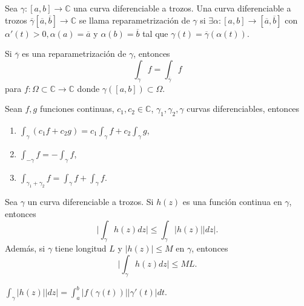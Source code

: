 \begin{defn}[Reparametrización]
  Sea $\gamma: [a, b] \to \mathbb{C}$ una curva diferenciable a trozos. Una curva diferenciable a trozos $\overline{\gamma} [\overline{a}, \overline{b}] \to \mathbb{C}$ se llama reparametrización de $\gamma$ si $\exists \alpha: [a, b] \to [\overline{a}, \overline{b}]$ con $\alpha'(t) > 0, \alpha(a) = \overline{a}$ y $\alpha(b)= \overline{b}$ tal que $\gamma(t) = \overline{\gamma}(\alpha(t))$.
\end{defn}

\begin{prop}
  Si $\overline{\gamma}$ es una reparametrización de $\gamma$, entonces
  \[ 
    \int_{\gamma}^{} f = \int_{\overline{\gamma}}^{} f 
  \] 
  para $f: \Omega \subset \mathbb{C} \to \mathbb{C}$ donde $ \gamma([a, b]) \subset \Omega$.
\end{prop}

\begin{prop}
  Sean $f,g$ funciones continuas, $c_{1}, c_{2} \in \mathbb{C}$, $\gamma_{1}, \gamma_{2}, \gamma$ curvas diferenciables, entonces
  \begin{enumerate}[label=(\roman*)]
    \item $\int_{\gamma}^{} (c_{1} f + c_{2} g) = c_{1} \int_{\gamma}^{} f + c_{2} \int_{\gamma}^{}  g$,
    \item $\int_{-\gamma}^{} f = - \int_{\gamma}^{} f$,
    \item $\int_{\gamma_{1} + \gamma_{2}}^{} f = \int_{\gamma}^{} f + \int_{\gamma}^{} f$.
  \end{enumerate}
\end{prop}

\begin{theo}
  Sea $\gamma$ un curva diferenciable a trozos. Si $h(z)$ es una función continua en $\gamma$, entonces
  \[ 
    \Big | \int_{\gamma}^{} h(z) dz \Big | \leq \int_{\gamma}^{} | h(z) | | dz | .
  \] 
  Además, si $\gamma$ tiene longitud $L$ y $| h(z) | \leq M$ en $\gamma$, entonces
  \[ 
    \Big | \int_{\gamma}^{} h(z) dz \Big | \leq ML .
  \] 
\end{theo}

\begin{obs}
  $\int_{\gamma}^{} | h(z) | | dz | = \int_{a}^{b} | f(\gamma(t)) || \gamma'(t) | dt.$ 
\end{obs}

